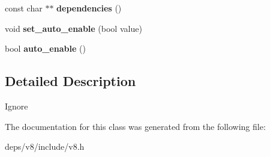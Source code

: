 \begin{DoxyCompactItemize}
\item 
\hypertarget{classv8_1_1_extension_adbec8a811d5a4554678da4a5d55dda6d}{}const char $\ast$$\ast$ {\bfseries dependencies} ()\label{classv8_1_1_extension_adbec8a811d5a4554678da4a5d55dda6d}

\item 
\hypertarget{classv8_1_1_extension_af5b752ba211315b6e9dac5c0e6e638e8}{}void {\bfseries set\+\_\+auto\+\_\+enable} (bool value)\label{classv8_1_1_extension_af5b752ba211315b6e9dac5c0e6e638e8}

\item 
\hypertarget{classv8_1_1_extension_aee87ef4f9c3d7880fc3b28765d28e516}{}bool {\bfseries auto\+\_\+enable} ()\label{classv8_1_1_extension_aee87ef4f9c3d7880fc3b28765d28e516}

\end{DoxyCompactItemize}


\subsection{Detailed Description}
Ignore 

The documentation for this class was generated from the following file\+:\begin{DoxyCompactItemize}
\item 
deps/v8/include/v8.\+h\end{DoxyCompactItemize}

